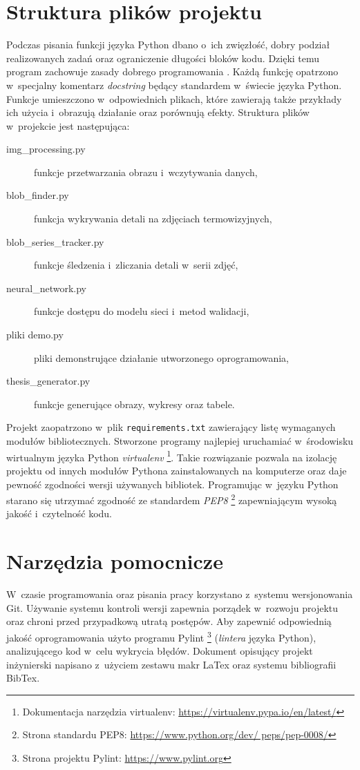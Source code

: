 \section{Struktura plików projektu}
Podczas pisania funkcji języka Python dbano o~ich zwięzłość, dobry podział
realizowanych zadań oraz ograniczenie długości bloków kodu.
Dzięki temu program zachowuje zasady dobrego programowania \cite{martin_code}.
Każdą funkcję opatrzono w~specjalny komentarz \emph{docstring} będący standardem
w~świecie języka Python.
Funkcje umieszczono w~odpowiednich plikach, które zawierają także przykłady ich
użycia i~obrazują działanie oraz porównują efekty.
Struktura plików w~projekcie jest następująca:
\begin{description}
    \item[img\_processing.py]
        funkcje przetwarzania obrazu i~wczytywania danych,
    \item[blob\_finder.py]
        funkcja wykrywania detali na zdjęciach termowizyjnych,
    \item[blob\_series\_tracker.py]
        funkcje śledzenia i~zliczania detali w~serii zdjęć,
    \item[neural\_network.py]
        funkcje dostępu do modelu sieci i~metod walidacji,
    \item[pliki demo.py]
        pliki demonstrujące działanie utworzonego oprogramowania,
    \item[thesis\_generator.py]
        funkcje generujące obrazy, wykresy oraz tabele.
\end{description}

Projekt zaopatrzono w~plik \texttt{requirements.txt} zawierający listę
wymaganych modułów bibliotecznych.
Stworzone programy najlepiej uruchamiać w~środowisku wirtualnym języka Python
\emph{virtualenv}%
\footnote{%
    Dokumentacja narzędzia virtualenv:
    \url{https://virtualenv.pypa.io/en/latest/}}.
Takie rozwiązanie pozwala na izolację projektu od innych modułów Pythona
zainstalowanych na komputerze oraz daje pewność zgodności wersji używanych
bibliotek.
Programując w~języku Python starano się utrzymać zgodność ze standardem
\emph{PEP8}%
\footnote{%
    Strona standardu PEP8: \url{https://www.python.org/dev/ peps/pep-0008/}}
zapewniającym wysoką jakość i~czytelność kodu.

\section{Narzędzia pomocnicze}
W~czasie programowania oraz pisania pracy korzystano z~systemu wersjonowania
Git.
Używanie systemu kontroli wersji zapewnia porządek w~rozwoju projektu oraz
chroni przed przypadkową utratą postępów.
Aby zapewnić odpowiednią jakość oprogramowania użyto programu Pylint%
\footnote{%
    Strona projektu Pylint: \url{https://www.pylint.org}}
(\emph{lintera} języka Python), analizującego kod w~celu wykrycia błędów.
Dokument opisujący projekt inżynierski napisano z~użyciem zestawu makr LaTex
oraz systemu bibliografii BibTex.
